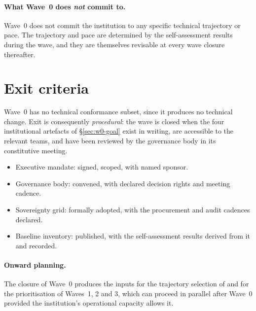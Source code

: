 \paragraph{What Wave~0 does \emph{not} commit to.} Wave~0 does not
commit the institution to any specific technical trajectory or pace.
The trajectory and pace are determined by the self-assessment
results during the wave, and they are themselves revisable at
every wave closure thereafter.

\section{Exit criteria}
\label{sec:w0-exit}

Wave~0 has no technical conformance subset, since it produces no
technical change. Exit is consequently \emph{procedural}: the wave
is closed when the four institutional artefacts of
\S\ref{sec:w0-goal} exist in writing, are accessible to the
relevant teams, and have been reviewed by the governance body in
its constitutive meeting.

\begin{itemize}[leftmargin=1.5em,nosep]
  \item Executive mandate: signed, scoped, with named sponsor.
  \item Governance body: convened, with declared decision rights
    and meeting cadence.
  \item Sovereignty grid: formally adopted, with the procurement
    and audit cadences declared.
  \item Baseline inventory: published, with the self-assessment
    results derived from it and recorded.
\end{itemize}

\paragraph{Onward planning.} The closure of Wave~0 produces the
inputs for the trajectory selection of
 and for the prioritisation of
Waves~1, 2 and 3, which can proceed in parallel after Wave~0
provided the institution's operational capacity allows it.

